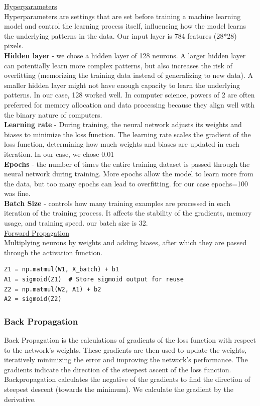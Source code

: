 \documentclass{article}
\begin{document}
\underline{Hyperparameters} \\
Hyperparameters are settings that are set before training a machine learning model and control the learning process itself, influencing how the model learns the underlying patterns in the data. Our input layer is 784 features (28*28) pixels. \\
\textbf{Hidden layer} - we chose a hidden layer of 128 neurons. A larger hidden layer can potentially learn more complex patterns, but also increases the risk of overfitting (memorizing the training data instead of generalizing to new data). A smaller hidden layer might not have enough capacity to learn the underlying patterns. In our case, 128 worked well. In computer science, powers of 2 are often preferred for memory allocation and data processing because they align well with the binary nature of computers. \\
\textbf{Learning rate} - During training, the neural network adjusts its weights and biases to minimize the loss function. The learning rate scales the gradient of the loss function, determining how much weights and biases are updated in each iteration. In our case, we chose 0.01 \\
\textbf{Epochs} - the number of times the entire training dataset is passed through the neural network during training. More epochs allow the model to learn more from the data, but too many epochs can lead to overfitting. for our case epochs=100 was fine. \\
\textbf{Batch Size} - controls how many training examples are processed in each iteration of the training process. It affects the stability of the gradients, memory usage, and training speed. our batch size is 32. \\

\underline{Forward Propagation} \\
Multiplying neurons by weights and adding biases, after which they are passed through the activation function.
\begin{lstlisting}
Z1 = np.matmul(W1, X_batch) + b1
A1 = sigmoid(Z1)  # Store sigmoid output for reuse
Z2 = np.matmul(W2, A1) + b2
A2 = sigmoid(Z2)
\end{lstlisting} 

\subsubsection{Back Propagation}
Back Propagation is the calculations of gradients of the loss function with respect to the network's weights. These gradients are then used to update the weights, iteratively minimizing the error and improving the network's performance. The gradients indicate the direction of the steepest ascent of the loss function. Backpropagation calculates the negative of the gradients to find the direction of steepest descent (towards the minimum). We calculate the gradient by the derivative.
\end{document}
